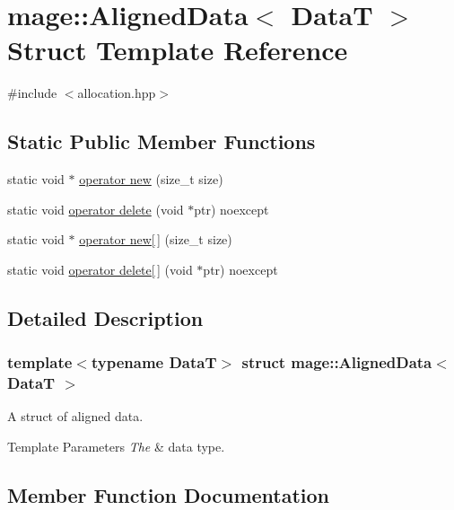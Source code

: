 \hypertarget{structmage_1_1_aligned_data}{}\section{mage\+:\+:Aligned\+Data$<$ DataT $>$ Struct Template Reference}
\label{structmage_1_1_aligned_data}


{\ttfamily \#include $<$allocation.\+hpp$>$}

\subsection*{Static Public Member Functions}
\begin{DoxyCompactItemize}
\item 
static void $\ast$ \hyperlink{structmage_1_1_aligned_data_a0ddb884f1857519ceaf10d8980ff896b}{operator new} (size\+\_\+t size)
\item 
static void \hyperlink{structmage_1_1_aligned_data_a3e0b0d36f1a0a9ec78c1611103436ffc}{operator delete} (void $\ast$ptr) noexcept
\item 
static void $\ast$ \hyperlink{structmage_1_1_aligned_data_a139865ffc435aebff7703d68d8111f24}{operator new\mbox{[}$\,$\mbox{]}} (size\+\_\+t size)
\item 
static void \hyperlink{structmage_1_1_aligned_data_a257c2d30f4764caf48647e1f759d28b4}{operator delete\mbox{[}$\,$\mbox{]}} (void $\ast$ptr) noexcept
\end{DoxyCompactItemize}


\subsection{Detailed Description}
\subsubsection*{template$<$typename DataT$>$\newline
struct mage\+::\+Aligned\+Data$<$ Data\+T $>$}

A struct of aligned data.


\begin{DoxyTemplParams}{Template Parameters}
{\em The} & data type. \\
\hline
\end{DoxyTemplParams}


\subsection{Member Function Documentation}
\hypertarget{structmage_1_1_aligned_data_a3e0b0d36f1a0a9ec78c1611103436ffc}{}\label{structmage_1_1_aligned_data_a3e0b0d36f1a0a9ec78c1611103436ffc} 
